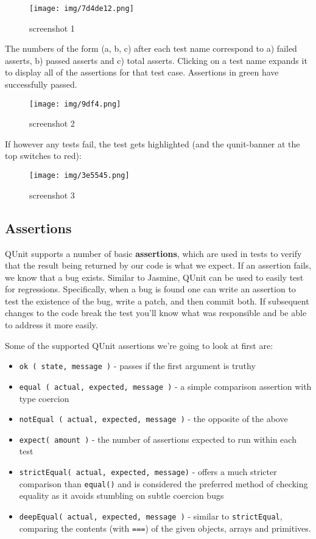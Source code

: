 \documentclass[9pt]{book}
\begin{document}
\begin{figure}[htbp]
\centering
\texttt{[image: img/7d4de12.png]}
\caption{screenshot 1}
\end{figure}

The numbers of the form (a, b, c) after each test name correspond to a)
failed asserts, b) passed asserts and c) total asserts. Clicking on a
test name expands it to display all of the assertions for that test
case. Assertions in green have successfully passed.

\begin{figure}[htbp]
\centering
\texttt{[image: img/9df4.png]}
\caption{screenshot 2}
\end{figure}

If however any tests fail, the test gets highlighted (and the
qunit-banner at the top switches to red):

\begin{figure}[htbp]
\centering
\texttt{[image: img/3e5545.png]}
\caption{screenshot 3}
\end{figure}

\subsection{Assertions}\label{assertions}

QUnit supports a number of basic \textbf{assertions}, which are used in
tests to verify that the result being returned by our code is what we
expect. If an assertion fails, we know that a bug exists. Similar to
Jasmine, QUnit can be used to easily test for regressions. Specifically,
when a bug is found one can write an assertion to test the existence of
the bug, write a patch, and then commit both. If subsequent changes to
the code break the test you'll know what was responsible and be able to
address it more easily.

Some of the supported QUnit assertions we're going to look at first are:

\begin{itemize}
\itemsep1pt\parskip0pt
\item
  \texttt{ok ( state, message )} - passes if the first argument is
  truthy
\item
  \texttt{equal ( actual, expected, message )} - a simple comparison
  assertion with type coercion
\item
  \texttt{notEqual ( actual, expected, message )} - the opposite of the
  above
\item
  \texttt{expect( amount )} - the number of assertions expected to run
  within each test
\item
  \texttt{strictEqual( actual, expected, message)} - offers a much
  stricter comparison than \texttt{equal()} and is considered the
  preferred method of checking equality as it avoids stumbling on subtle
  coercion bugs
\item
  \texttt{deepEqual( actual, expected, message )} - similar to
  \texttt{strictEqual}, comparing the contents (with \texttt{===}) of
  the given objects, arrays and primitives.
\end{itemize}
\end{document}
